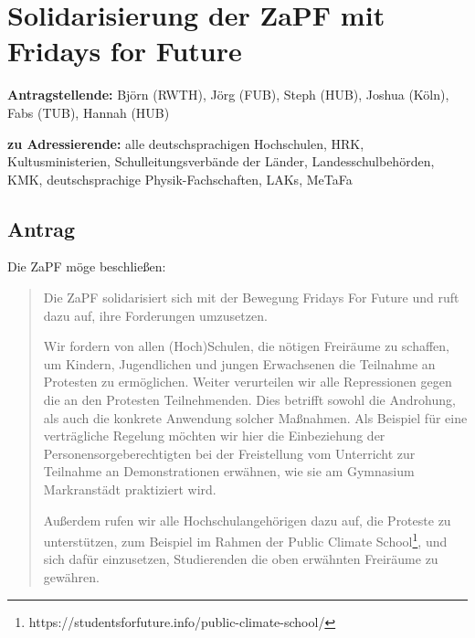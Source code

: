 \documentclass[draft,10pt,oneside]{scrartcl}
\begin{document}
\section*{Solidarisierung der ZaPF mit Fridays for Future}

\textbf{Antragstellende:} Björn (RWTH), Jörg (FUB), Steph (HUB), Joshua
(Köln), Fabs (TUB), Hannah (HUB)

\textbf{zu Adressierende:} alle deutschsprachigen Hochschulen, HRK,
Kultusministerien, Schulleitungsverbände der Länder, Landesschulbehörden, KMK,
deutschsprachige Physik-Fachschaften, LAKs, MeTaFa

\subsection*{Antrag}

Die ZaPF möge beschließen:

\begin{quote}
    Die ZaPF solidarisiert sich mit der Bewegung \glqq{}Fridays For
    Future\grqq{} und ruft dazu auf, ihre Forderungen umzusetzen.

    Wir fordern von allen (Hoch)Schulen, die nötigen Freiräume zu schaffen, um
    Kindern, Jugendlichen und jungen Erwachsenen die Teilnahme an Protesten zu
    ermöglichen.  Weiter verurteilen wir alle Repressionen gegen die an den
    Protesten Teilnehmenden. Dies betrifft sowohl die Androhung, als auch die
    konkrete Anwendung solcher Maßnahmen. Als Beispiel für eine verträgliche
    Regelung möchten wir hier die Einbeziehung der Personensorgeberechtigten
    bei der Freistellung vom Unterricht zur Teilnahme an Demonstrationen
    erwähnen, wie sie am Gymnasium Markranstädt praktiziert wird.

    Außerdem rufen wir alle Hochschulangehörigen dazu auf, die Proteste zu
    unterstützen, zum Beispiel im Rahmen der Public Climate
    School\footnote{https://studentsforfuture.info/public-climate-school/}, und
    sich dafür einzusetzen, Studierenden die oben erwähnten Freiräume zu
    gewähren.
\end{quote}
\end{document}
